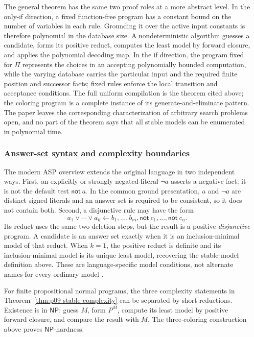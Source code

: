 The general theorem has the same two proof roles at a more abstract level.  In
the only-if direction, a fixed function-free program has a constant bound on
the number of variables in each rule.  Grounding it over the active input
constants is therefore polynomial in the database size.  A nondeterministic
algorithm guesses a candidate, forms its positive reduct, computes the least
model by forward closure, and applies the polynomial decoding map.  In the
if direction, the program fixed for \(\Pi\) represents the choices in an
accepting polynomially bounded computation, while the varying database carries
the particular input and the required finite position and successor facts;
fixed rules enforce the local transition and acceptance conditions.  The full
uniform compilation is the theorem cited above; the coloring program is a
complete instance of its generate-and-eliminate pattern.  The paper leaves the
corresponding characterization of arbitrary search problems open, and no part
of the theorem says that all stable models can be enumerated in polynomial time.

\subsubsection{Answer-set syntax and complexity boundaries}

The modern ASP overview extends the original language in two independent ways.
First, an explicitly or strongly negated literal \(\neg a\) asserts a negative
fact; it is not the default test \(\mathsf{not}\ a\).  In the common ground
presentation, \(a\) and \(\neg a\) are distinct signed literals and an answer
set is required to be consistent, so it does not contain both.  Second, a
disjunctive rule may have the form
\[
 a_1\lor\cdots\lor a_k
 \leftarrow b_1,\ldots,b_m,
   \mathsf{not}\ c_1,\ldots,\mathsf{not}\ c_n.
\]
Its reduct uses the same two deletion steps, but the result is a positive
\emph{disjunctive} program.  A candidate is an answer set exactly when it is an
inclusion-minimal model of that reduct.  When \(k=1\), the positive reduct is
definite and its inclusion-minimal model is its unique least model, recovering
the stable-model definition above.  These are language-specific model
conditions, not alternate names for every ordinary model
\cite[pp.~93--97]{BrewkaEiterTruszczynski2011}.

For finite propositional normal programs, the three complexity statements in
Theorem~\ref{thm:p09-stable-complexity} can be separated by short reductions.
Existence is in \(\mathsf{NP}\): guess \(M\), form \(P^M\), compute its least
model by positive forward closure, and compare the result with \(M\).  The
three-coloring construction above proves \(\mathsf{NP}\)-hardness.

